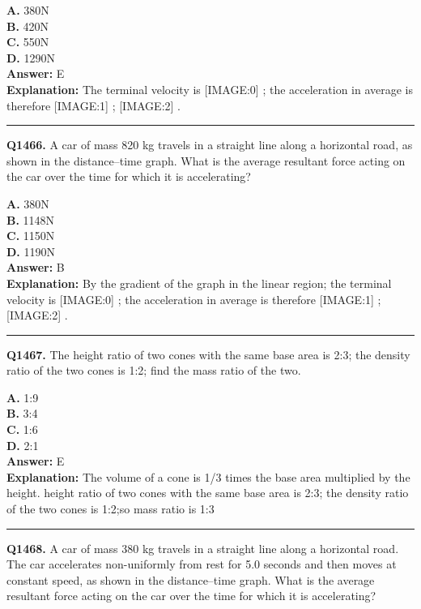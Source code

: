 \documentclass[12pt]{article}
\begin{document}
\textbf{A.} 380N \\
\textbf{B.} 420N \\
\textbf{C.} 550N \\
\textbf{D.} 1290N \\

\textbf{Answer:} E \\
\textbf{Explanation:} The terminal velocity is
[IMAGE:0]
; the acceleration in average is therefore
[IMAGE:1]
;
[IMAGE:2]
.

\hrule
\vspace{1em}


\noindent
\textbf{Q1466.} A car of mass 820 kg travels in a straight line along a horizontal road, as shown in the distance–time graph.
What is the average resultant force acting on the car over the time for which it is accelerating?



\textbf{A.} 380N \\
\textbf{B.} 1148N \\
\textbf{C.} 1150N \\
\textbf{D.} 1190N \\

\textbf{Answer:} B \\
\textbf{Explanation:} By the gradient of the graph in the linear region; the terminal velocity is
[IMAGE:0]
; the acceleration in average is therefore
[IMAGE:1]
;
[IMAGE:2]
.

\hrule
\vspace{1em}


\noindent
\textbf{Q1467.} The height ratio of two cones with the same base area is 2:3; the density ratio of the two cones is 1:2; find the mass ratio of the two.



\textbf{A.} 1:9 \\
\textbf{B.} 3:4 \\
\textbf{C.} 1:6 \\
\textbf{D.} 2:1 \\

\textbf{Answer:} E \\
\textbf{Explanation:} The volume of a cone is 1/3 times the base area multiplied by the height. height ratio of two cones with the same base area is 2:3; the density ratio of the two cones is 1:2;so mass ratio is 1:3

\hrule
\vspace{1em}


\noindent
\textbf{Q1468.} A car of mass 380 kg travels in a straight line along a horizontal road.
The car accelerates non-uniformly from rest for 5.0 seconds and then moves at constant speed, as shown in the distance–time graph.
What is the average resultant force acting on the car over the time for which it is accelerating?
\end{document}
